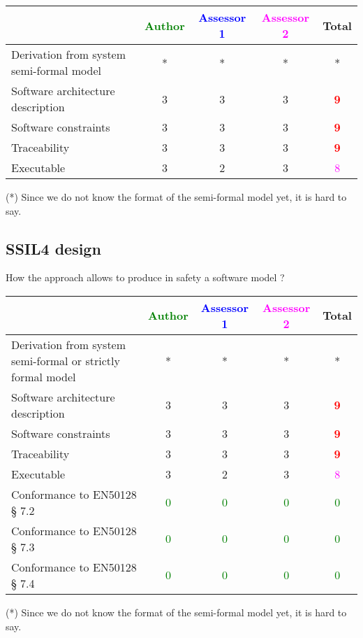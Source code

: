 \begin{tabular}{|l | c | c | c | c|}
\hline
& \textcolor{green}{Author} & \textcolor{blue}{Assessor 1} & \textcolor{magenta}{Assessor 2} & Total \\
\hline
Derivation from system semi-formal model  &* &* & *& * \\
\hline 
Software architecture description  &3 &3 & 3   & \textcolor{red}{\textbf{9}} \\
\hline
Software constraints  &3 &3 & 3   & \textcolor{red}{\textbf{9}} \\
\hline
Traceability  &3 &3 & 3   & \textcolor{red}{\textbf{9}} \\
\hline
Executable  &3 &2 & 3   & \textcolor{magenta}{8} \\
\hline
\end{tabular}
\begin{author_comment}
(*) Since we do not know the format of the semi-formal model  yet, it is hard to say.
\end{author_comment}

\subsection{SSIL4 design}

How the approach allows to  produce in safety a software model ?

\begin{tabular}{|l | c | c | c | c|}
\hline
& \textcolor{green}{Author} & \textcolor{blue}{Assessor 1} & \textcolor{magenta}{Assessor 2} & Total \\
\hline
Derivation from system semi-formal or strictly formal model  &* &* & *& * \\
\hline 
Software architecture description  &3 &3 & 3   & \textcolor{red}{\textbf{9}} \\
\hline
Software constraints  &3 &3 & 3   & \textcolor{red}{\textbf{9}} \\
\hline
Traceability  &3 &3 & 3   & \textcolor{red}{\textbf{9}} \\
\hline
Executable  &3 &2 & 3   & \textcolor{magenta}{8} \\
\hline
Conformance to EN50128 § 7.2  & \textcolor{green}{0}   & \textcolor{green}{0}   & \textcolor{green}{0} & \textcolor{green}{0} \\
\hline
Conformance to EN50128 § 7.3  & \textcolor{green}{0}   & \textcolor{green}{0}   & \textcolor{green}{0} & \textcolor{green}{0} \\
\hline
Conformance to EN50128 § 7.4  & \textcolor{green}{0}   & \textcolor{green}{0}   & \textcolor{green}{0} & \textcolor{green}{0} \\
\hline
\end{tabular}
\begin{author_comment}
(*) Since we do not know the format of the semi-formal model  yet, it is hard to say.
\end{author_comment}

